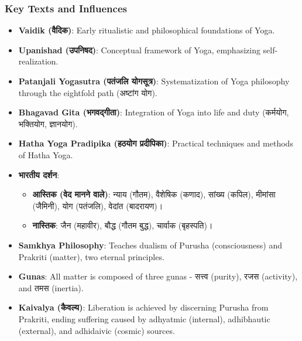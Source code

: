 \begin{frame}[fragile]\frametitle{Key Texts and Influences}

  \begin{itemize}
	\item \textbf{Vaidik (वैदिक)}: Early ritualistic and philosophical foundations of Yoga.
	\item \textbf{Upanishad (उपनिषद)}: Conceptual framework of Yoga, emphasizing self-realization.
	\item \textbf{Patanjali Yogasutra (पतंजलि योगसूत्र)}: Systematization of Yoga philosophy through the eightfold path (अष्टांग योग).
	\item \textbf{Bhagavad Gita (भगवद्गीता)}: Integration of Yoga into life and duty (कर्मयोग, भक्तियोग, ज्ञानयोग).
	\item \textbf{Hatha Yoga Pradipika (हठयोग प्रदीपिका)}: Practical techniques and methods of Hatha Yoga.
	\item \textbf{भारतीय दर्शन}:
		\begin{itemize}
			\item \textbf{आस्तिक (वेद मानने वाले)}: न्याय (गौतम), वैशेषिक (कणाद), सांख्य (कपिल), मीमांसा (जैमिनी), योग (पतंजलि), वेदांत (बादरायण)।
			\item \textbf{नास्तिक}: जैन (महावीर), बौद्ध (गौतम बुद्ध), चार्वाक (बृहस्पति)।
	    \end{itemize}
	\item \textbf{Samkhya Philosophy}: Teaches dualism of Purusha (consciousness) and Prakriti (matter), two eternal principles.
	\item \textbf{Gunas}: All matter is composed of three gunas - सत्त्व (purity), रजस (activity), and तमस (inertia).
	\item \textbf{Kaivalya (कैवल्य)}: Liberation is achieved by discerning Purusha from Prakriti, ending suffering caused by adhyatmic (internal), adhibhautic (external), and adhidaivic (cosmic) sources.
  \end{itemize}

\end{frame}

